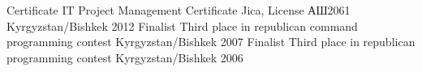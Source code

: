 \begin{cvhonors}
  \cvhonor
    {Certificate}
    {IT Project Management Certificate Jica, License АШ2061}
    {Kyrgyzstan/Bishkek}
    {2012}
  \cvhonor
    {Finalist}
    {Third place in republican command programming contest}
    {Kyrgyzstan/Bishkek}
    {2007}
  \cvhonor
    {Finalist}
    {Third place in republican programming contest}
    {Kyrgyzstan/Bishkek}
    {2006}
\end{cvhonors}
